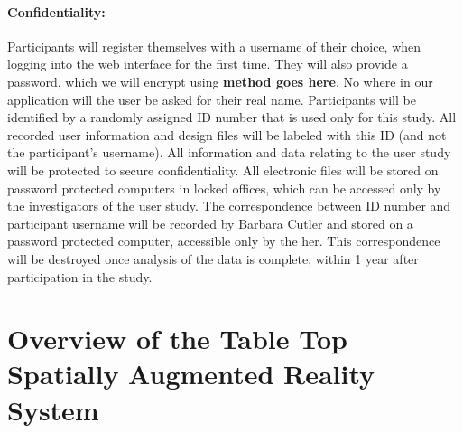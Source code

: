 \documentclass[12pt]{article}
\begin{document}
\paragraph{Confidentiality:} %
Participants will register themselves with a username of their choice,
when logging into the web interface for the first time. They will also provide
a password, which we will encrypt using \textbf{method goes here}. No where in 
our application will the user be asked for their real name. Participants 
will be identified by a randomly assigned ID number that is used only for 
this study. All recorded user information and design files will be labeled 
with this ID (and not the participant's username). All information and data 
relating to the user study will be protected to secure confidentiality. 
All electronic files will be stored on password protected computers in 
locked offices, which can be accessed only by the investigators of the user 
study. The correspondence between ID number and participant username will 
be recorded by Barbara Cutler and stored on a password protected computer, 
accessible only by the her. This correspondence will be destroyed once analysis 
of the data is complete, within 1 year after participation in the study.

\newpage

\section{Overview of the Table Top Spatially Augmented Reality System}


\end{document}
